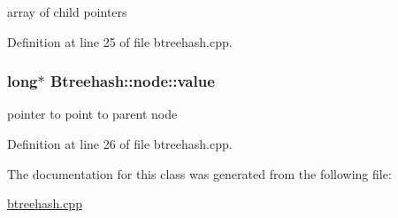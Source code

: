 array of child pointers 



Definition at line 25 of file btreehash.\-cpp.

\hypertarget{class_btreehash_1_1node_aa466b9c9e1315209f850a42d50115371}{
\subsubsection[{value}]{\setlength{\rightskip}{0pt plus 5cm}long$\ast$ Btreehash\-::node\-::value}}\label{class_btreehash_1_1node_aa466b9c9e1315209f850a42d50115371}


pointer to point to parent node 



Definition at line 26 of file btreehash.\-cpp.



The documentation for this class was generated from the following file\-:\begin{DoxyCompactItemize}
\item 
\hyperlink{btreehash_8cpp}{btreehash.\-cpp}\end{DoxyCompactItemize}
